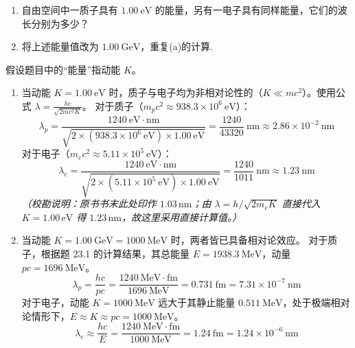 \begin{exercise}\label{ex:23.5}
\begin{enumerate}
  \item[(a)] 自由空间中一质子具有 $1.00 \ \mathrm{eV}$ 的能量，另有一电子具有同样能量，它们的波长分别为多少？
  \item[(b)] 将上述能量值改为 $1.00 \ \mathrm{GeV}$，重复(a)的计算.
\end{enumerate}
\end{exercise}
\begin{solution}
假设题目中的“能量”指动能 $K$。
\begin{enumerate}
    \item[(a)] 当动能 $K = 1.00 \ \mathrm{eV}$ 时，质子与电子均为非相对论性的（$K \ll mc^2$）。使用公式 $\lambda = \frac{hc}{\sqrt{2mc^2 K}}$。
    对于质子（$m_p c^2 \approx 938.3 \times 10^6 \ \mathrm{eV}$）：
    $$ \lambda_p = \frac{1240 \ \mathrm{eV \cdot nm}}{\sqrt{2 \times (938.3 \times 10^6 \ \mathrm{eV}) \times 1.00 \ \mathrm{eV}}} = \frac{1240}{43320} \ \mathrm{nm} \approx 2.86 \times 10^{-2} \ \mathrm{nm} $$
    对于电子（$m_e c^2 \approx 5.11 \times 10^5 \ \mathrm{eV}$）：
    $$ \lambda_e = \frac{1240 \ \mathrm{eV \cdot nm}}{\sqrt{2 \times (5.11 \times 10^5 \ \mathrm{eV}) \times 1.00 \ \mathrm{eV}}} = \frac{1240}{1011} \ \mathrm{nm} \approx 1.23 \ \mathrm{nm} $$
    \textit{（校勘说明：原书书末此处印作 $1.03\,\mathrm{nm}$；由 $\lambda=h/\sqrt{2m_eK}$ 直接代入 $K=1.00\,\mathrm{eV}$ 得 $1.23\,\mathrm{nm}$，故这里采用直接计算值。）}

    \item[(b)] 当动能 $K = 1.00 \ \mathrm{GeV} = 1000 \ \mathrm{MeV}$ 时，两者皆已具备相对论效应。
    对于质子，根据题 23.1 的计算结果，其总能量 $E = 1938.3 \ \mathrm{MeV}$，动量 $pc = 1696 \ \mathrm{MeV}$。
    $$ \lambda_p = \frac{hc}{pc} = \frac{1240 \ \mathrm{MeV \cdot fm}}{1696 \ \mathrm{MeV}} = 0.731 \ \mathrm{fm} = 7.31 \times 10^{-7} \ \mathrm{nm} $$
    对于电子，动能 $K = 1000 \ \mathrm{MeV}$ 远大于其静止能量 $0.511 \ \mathrm{MeV}$，处于极端相对论情形下，$E \approx K \approx pc = 1000 \ \mathrm{MeV}$。
    $$ \lambda_e \approx \frac{hc}{E} = \frac{1240 \ \mathrm{MeV \cdot fm}}{1000 \ \mathrm{MeV}} = 1.24 \ \mathrm{fm} = 1.24 \times 10^{-6} \ \mathrm{nm} $$
\end{enumerate}
\end{solution}

